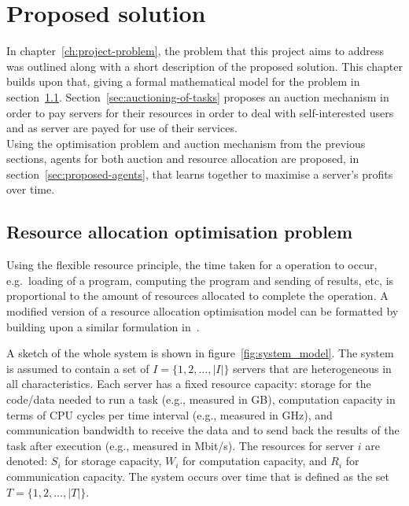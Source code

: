 \chapter{Proposed solution}\label{ch:proposed-solution}
In chapter~\ref{ch:project-problem}, the problem that this project aims to address was outlined along with a short
description of the proposed solution. This chapter builds upon that, giving a formal mathematical model for the problem
in section~\ref{sec:optimisation-problem}. Section~\ref{sec:auctioning-of-tasks} proposes an auction mechanism in order
to pay servers for their resources in order to deal with self-interested users and as server are payed for use of their
services. \\
Using the optimisation problem and auction mechanism from the previous sections, agents for both auction and resource
allocation are proposed, in section~\ref{sec:proposed-agents}, that learns together to maximise a server's profits
over time.

\section{Resource allocation optimisation problem}\label{sec:optimisation-problem}
Using the flexible resource principle, the time taken for a operation to occur, e.g.\ loading of a program, computing
the program and sending of results, etc, is proportional to the amount of resources allocated to complete the operation.
A modified version of a resource allocation optimisation model can be formatted by building upon a similar formulation
in~\cite{FlexibleResourceAllocation}.

A sketch of the whole system is shown in figure~\ref{fig:system_model}.
The system is assumed to contain a set of $I = \{1,2,\ldots,\left|I\right|\}$ servers that are heterogeneous in all
characteristics. Each server has a fixed resource capacity: storage for the code/data needed to run a task
(e.g., measured in GB), computation capacity in terms of CPU cycles per time interval (e.g., measured in GHz),
and communication bandwidth to receive the data and to send back the results of the task after execution
(e.g., measured in Mbit/s). The resources for server $i$ are denoted: $S_i$ for storage capacity, $W_i$ for computation
capacity, and $R_i$ for communication capacity. The system occurs over time that is defined as the set
$T = \{1,2,\ldots,\left|T\right|\}$.

